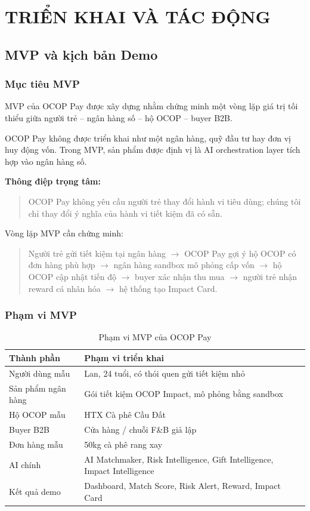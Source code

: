\documentclass[13pt,a4paper]{extarticle}
\begin{document}
\section{TRIỂN KHAI VÀ TÁC ĐỘNG}

\subsection{MVP và kịch bản Demo}

\subsubsection{Mục tiêu MVP}

MVP của OCOP Pay được xây dựng nhằm chứng minh một vòng lặp giá trị tối thiểu giữa người trẻ -- ngân hàng số -- hộ OCOP -- buyer B2B.

OCOP Pay không được triển khai như một ngân hàng, quỹ đầu tư hay đơn vị huy động vốn. Trong MVP, sản phẩm được định vị là AI orchestration layer tích hợp vào ngân hàng số.

\textbf{Thông điệp trọng tâm:}
\begin{quote}
OCOP Pay không yêu cầu người trẻ thay đổi hành vi tiêu dùng; chúng tôi chỉ thay đổi ý nghĩa của hành vi tiết kiệm đã có sẵn.
\end{quote}

Vòng lặp MVP cần chứng minh:
\begin{quote}
Người trẻ gửi tiết kiệm tại ngân hàng $\rightarrow$ OCOP Pay gợi ý hộ OCOP có đơn hàng phù hợp $\rightarrow$ ngân hàng sandbox mô phỏng cấp vốn $\rightarrow$ hộ OCOP cập nhật tiến độ $\rightarrow$ buyer xác nhận thu mua $\rightarrow$ người trẻ nhận reward cá nhân hóa $\rightarrow$ hệ thống tạo Impact Card.
\end{quote}

\subsubsection{Phạm vi MVP}

\begin{table}[H]
\centering
\caption{Phạm vi MVP của OCOP Pay}
\begin{tabular}{|p{4cm}|p{9cm}|}
\hline
\textbf{Thành phần} & \textbf{Phạm vi triển khai} \\
\hline
Người dùng mẫu & Lan, 24 tuổi, có thói quen gửi tiết kiệm nhỏ \\
\hline
Sản phẩm ngân hàng & Gói tiết kiệm OCOP Impact, mô phỏng bằng sandbox \\
\hline
Hộ OCOP mẫu & HTX Cà phê Cầu Đất \\
\hline
Buyer B2B & Cửa hàng / chuỗi F\&B giả lập \\
\hline
Đơn hàng mẫu & 50kg cà phê rang xay \\
\hline
AI chính & AI Matchmaker, Risk Intelligence, Gift Intelligence, Impact Intelligence \\
\hline
Kết quả demo & Dashboard, Match Score, Risk Alert, Reward, Impact Card \\
\hline
\end{tabular}
\end{table}
\end{document}
